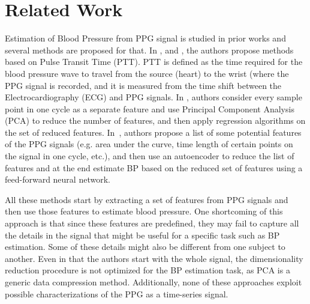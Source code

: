 \documentclass[letterpaper, 10 pt, conference]{ieeeconf}
\begin{document}
\section{Related Work} 
\label{sec: background}
Estimation of Blood Pressure from PPG signal is studied in prior works and several methods are proposed for that. In \cite{7168806}, \cite{lass2004continuous} and \cite{Miao2017}, the authors propose methods based on Pulse Transit Time (PTT). PTT is defined as the time required for the blood pressure wave to travel from the source (heart) to the wrist (where the PPG signal is recorded, and it is measured from the time shift between the Electrocardiography (ECG) and PPG signals. In \cite{MOUSAVI2019196}, authors consider every sample point in one cycle as a separate feature and use Principal Component Analysis (PCA) to reduce the number of features, and then apply regression algorithms on the set of reduced features. In~\cite{shimazaki2018features}, authors propose a list of some potential features of the PPG signals (e.g. area under the curve, time length of certain points on the signal in one cycle, etc.), and then use an autoencoder to reduce the list of features and at the end estimate BP based on the reduced set of features using a feed-forward neural network. 

All these methods start by extracting a set of features from PPG signals and then use those features to estimate blood pressure. 
One shortcoming of this approach is that since these features are predefined, they may fail to capture all the details in the signal that might be useful for a specific task such as BP estimation. Some of these details might also be different from one subject to another.
Even in \cite{MOUSAVI2019196} that the authors start with the whole signal, the dimensionality reduction procedure is not optimized for the BP estimation task, as PCA is a generic data compression method.
Additionally, none of these approaches exploit possible characterizations of the PPG as a time-series signal.
\end{document}
